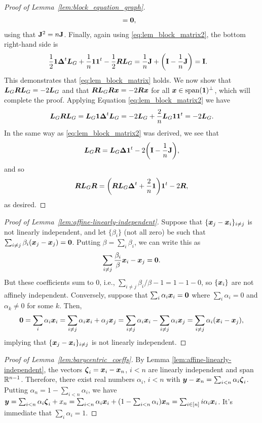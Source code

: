 \begin{proof}[Proof of Lemma~\ref{lem:block_equation_graph}]
\begin{align*}
	&=\vb{0},
	\end{align*}
	using that $\vb{J}^2 = n \vb{J}$. Finally, again using \eqref{eq:lem_block_matrix2}, the bottom right-hand side is 
	\begin{align*}
	\frac{1}{2}\vb{1} \vb*{\Delta}^t \vb*{L}_G + \frac{1}{n}\vb{1}\vb{1}^t - \frac{1}{2}\vb*{R}\vb*{L}_G &= \frac{1}{n}\vb{J} + \bigg(\vb{I}-\frac{1}{n}\vb{J}\bigg) = \vb{I}.
	\end{align*}
	This demonstrates that \eqref{eq:lem_block_matrix} holds. We now show that $\vb*{L}_G \vb*{R}\vb*{L}_G = -2 \vb*{L}_G$ and that $\vb*{R}\vb*{L}_G\vb*{R}\vb*{x} = -2\vb*{R}\vb*{x}$ for all $\vb*{x}\in\textnormal{span}(\vb{1})^\perp$, which will complete the proof. Applying Equation \eqref{eq:lem_block_matrix2} we have 
	\begin{align*}
	\vb*{L}_G\vb*{R}\vb*{L}_G = \vb*{L}_G\vb{1} \vb*{\Delta}^t\vb*{L}_G = -2\vb*{L}_G+ \frac{2}{n}\vb*{L}_G\vb{1}\vb{1}^t = -2\vb*{L}_G.
	\end{align*}
	In the same way as \eqref{eq:lem_block_matrix2} was derived, we see that 
	\begin{equation*}
	\vb*{L}_G\vb*{R} = \vb*{L}_G\vb*{\Delta}\vb{1}^t - 2\bigg(\vb{I}-\frac{1}{n}\vb{J}\bigg),
	\end{equation*}
	and so 
	\begin{equation*}
	\vb*{R}\vb*{L}_G\vb*{R}= \bigg(\vb*{R}\vb*{L}_G\vb*{\Delta}^t + \frac{2}{n}\vb{1} \bigg)\vb{1}^t -2\vb*{R},
	\end{equation*}
	as desired. 
\end{proof}


\begin{proof}[Proof of Lemma~\ref{lem:affine-linearly-independent}]
	Suppose that $\{\vb*{x}_j-\vb*{x}_i\}_{i\neq j}$ is not linearly independent, and let $\{\beta_i\}$ (not all zero) be such that $\sum_{i\neq j}\beta_i (\vb*{x}_j-\vb*{x}_j)=\vb{0}$. Putting $\beta=\sum_i \beta_i$, we can write this as 
	\[\sum_{i\neq j}\frac{\beta_i}{\beta}\vb*{x}_i - \vb*{x}_j=\vb{0}.\]
	But these coefficients sum to 0, i.e., $\sum_{i\neq j}\beta_i/\beta -1=1-1-0$, so $\{\vb*{x}_i\}$ are not affinely independent. Conversely, suppose that $\sum_i\alpha_i\vb*{x}_i=\vb{0}$ where $\sum_i\alpha_i=0$ and $\alpha_k\neq 0$ for some $k$. Then, 
	\[\vb{0} =\sum_i\alpha_i\vb*{x}_i = \sum_{i\neq j}\alpha_i\vb*{x}_i + \alpha_j\vb*{x}_j = \sum_{i\neq j}\alpha_i\vb*{x}_i - \sum_{i\neq j}\alpha_i\vb*{x}_j = \sum_{i\neq j}\alpha_i(\vb*{x}_i-\vb*{x}_j), \]
	implying that $\{\vb*{x}_j-\vb*{x}_i\}_{i\neq j}$ is not linearly independent. 
\end{proof}

\begin{proof}[Proof of Lemma~\ref{lem:barycentric_coeffs}]
	By Lemma \ref{lem:affine-linearly-independent}, the vectors $\vb*{\zeta}_i=\vb*{x}_i-\vb*{x}_n$, $i<n$ are linearly independent and span $\mathbb{R}^{n-1}$. Therefore, there exist real numbers $\alpha_i$, $i<n$ with $\vb*{y}-\vb*{x}_n = \sum_{i<n} \alpha_i\vb*{\zeta}_i$. Putting $\alpha_n=1-\sum_{i<n}\alpha_i$, we have $\vb*{y}=\sum_{i<n}\alpha_i\vb*{\zeta}_i + x_n = \sum_{i<n} \alpha_i\vb*{x}_i + (1-\sum_{i<n}\alpha_i)\vb*{x}_n = \sum_{i\in[n]}i \alpha_i\vb*{x}_i$. It's immediate that $\sum_i\alpha_i=1$. 
\end{proof}

